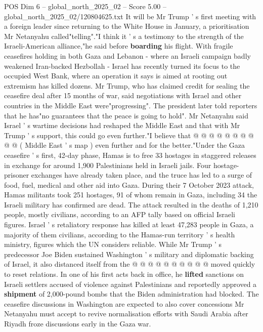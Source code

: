 \begin{textsample}{POS Dim 6 – global\_north\_2025\_02 – Score 5.00 – global\_north\_2025\_02/120804625.txt}  \label{ex:f6_pos_344}
It will be Mr Trump ' s first meeting with a foreign leader since returning to the White House in January, a prioritisation Mr Netanyahu called"telling"."I think it ' s a testimony to the strength of the Israeli-American alliance,"he said before \textbf{boarding} his flight.
With fragile ceasefires holding in both Gaza and Lebanon - where an Israeli campaign badly weakened Iran-backed Hezbollah - Israel has recently turned its focus to the occupied West Bank, where an operation it says is aimed at rooting out extremism has killed dozens.
Mr Trump, who has claimed credit for sealing the ceasefire deal after 15 months of war, said negotiations with Israel and other countries in the Middle East were"progressing".
The president later told reporters that he has"no guarantees that the peace is going to hold".
Mr Netanyahu said Israel ' s wartime decisions had reshaped the Middle East and that with Mr Trump ' s support, this could go even further."I believe that @ @ @ @ @ @ @ @ @ @ ( Middle East ' s map ) even further and for the better."Under the Gaza ceasefire ' s first, 42-day phase, Hamas is to free 33 hostages in staggered releases in exchange for around 1,900 Palestinians held in Israeli jails.
Four hostage-prisoner exchanges have already taken place, and the truce has led to a surge of food, fuel, medical and other aid into Gaza.
During their 7 October 2023 attack, Hamas militants took 251 hostages, 91 of whom remain in Gaza, including 34 the Israeli military has confirmed are dead.
The attack resulted in the deaths of 1,210 people, mostly civilians, according to an AFP tally based on official Israeli figures.
Israel ' s retaliatory response has killed at least 47,283 people in Gaza, a majority of them civilians, according to the Hamas-run territory ' s health ministry, figures which the UN considers reliable.
While Mr Trump ' s predecessor Joe Biden sustained Washington ' s military and diplomatic backing of Israel, it also distanced itself from the @ @ @ @ @ @ @ @ @ @ moved quickly to reset relations.
In one of his first acts back in office, he \textbf{lifted} sanctions on Israeli settlers accused of violence against Palestinians and reportedly approved a \textbf{shipment} of 2,000-pound bombs that the Biden administration had blocked.
The ceasefire discussions in Washington are expected to also cover concessions Mr Netanyahu must accept to revive normalisation efforts with Saudi Arabia after Riyadh froze discussions early in the Gaza war.

\end{textsample}
